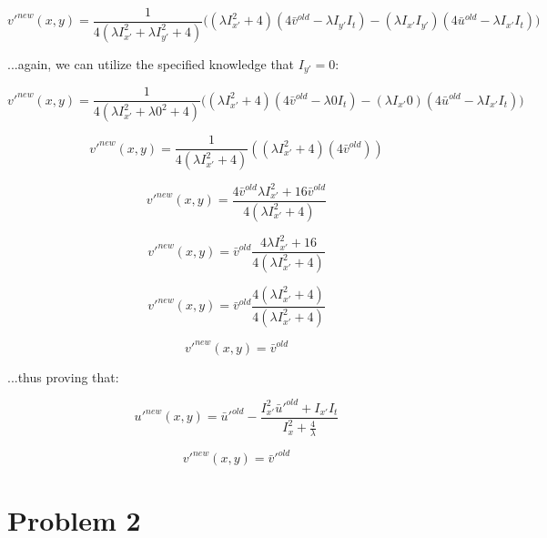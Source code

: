 \documentclass{article}
\begin{document}
\begin{equation}
    v'^{new}(x,y) = \frac{1}{4(\lambda I_{x'}^2+\lambda I_{y'}^2 + 4)}
    \bigl(
        (\lambda I_{x'}^2+4)(4\bar{v}^{old}-\lambda I_{y'}I_t)-(\lambda I_{x'}I_{y'})(4\bar{u}^{old}-\lambda I_{x'} I_t)
    \bigr)
\end{equation}

\noindent ...again, we can utilize the specified knowledge that $I_{y'}=0$:

\begin{equation}
    v'^{new}(x,y) = \frac{1}{4(\lambda I_{x'}^2+\lambda 0^2 + 4)}
    \bigl(
        (\lambda I_{x'}^2+4)(4\bar{v}^{old}-\lambda 0I_t)-(\lambda I_{x'}0)(4\bar{u}^{old}-\lambda I_{x'} I_t)
    \bigr)
\end{equation}

\begin{equation}
    v'^{new}(x,y) =
    \frac{1}{4(\lambda I_{x'}^2+ 4)}((\lambda I_{x'}^2+4)(4\bar{v}^{old}))
\end{equation}

\begin{equation}
    v'^{new}(x,y) =
    \frac{4\bar{v}^{old}\lambda I_{x'}^2+16\bar{v}^{old}}
    {4(\lambda I_{x'}^2+ 4)}
\end{equation}

\begin{equation}
    v'^{new}(x,y) = \bar{v}^{old}
    \frac{4\lambda I_{x'}^2+16}
    {4(\lambda I_{x'}^2+ 4)}
\end{equation}

\begin{equation}
    v'^{new}(x,y) = \bar{v}^{old}
    \frac{4(\lambda I_{x'}^2+4)}
    {4(\lambda I_{x'}^2+ 4)}
\end{equation}

\begin{equation}
    v'^{new}(x,y) = \bar{v}^{old}
\end{equation}

\noindent ...thus proving that:

\begin{equation}
    u'^{new}(x,y) = \bar{u}'^{old} - \frac{I_{x'}^2 \bar{u}'^{old} + I_{x'}I_t}{I_x^2+\frac{4}{\lambda}}
\end{equation}

\begin{equation}
    v'^{new}(x,y) = \bar{v}'^{old}
\end{equation}



\section*{Problem 2}
\end{document}

